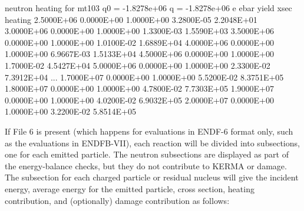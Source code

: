 \small
\begin{ccode}

 neutron heating for mt103   q0 = -1.8278e+06     q = -1.8278e+06
              e          ebar         yield          xsec       heating
     2.5000E+06    0.0000E+00    1.0000E+00    3.2800E-05    2.2048E+01
     3.0000E+06    0.0000E+00    1.0000E+00    1.3300E-03    1.5590E+03
     3.5000E+06    0.0000E+00    1.0000E+00    1.0100E-02    1.6889E+04
     4.0000E+06    0.0000E+00    1.0000E+00    6.9667E-03    1.5133E+04
     4.5000E+06    0.0000E+00    1.0000E+00    1.7000E-02    4.5427E+04
     5.0000E+06    0.0000E+00    1.0000E+00    2.3300E-02    7.3912E+04
        ...
     1.7000E+07    0.0000E+00    1.0000E+00    5.5200E-02    8.3751E+05
     1.8000E+07    0.0000E+00    1.0000E+00    4.7800E-02    7.7303E+05
     1.9000E+07    0.0000E+00    1.0000E+00    4.0200E-02    6.9032E+05
     2.0000E+07    0.0000E+00    1.0000E+00    3.2200E-02    5.8514E+05

\end{ccode}
\normalsize

If File 6 is present (which happens for evaluations in ENDF-6
format only, such as the evaluations in ENDFB-VII), each reaction
will be divided into subsections, one for each emitted particle.
The neutron subsections are displayed as part of the energy-balance
checks, but they do not contribute to KERMA or damage.  The
subsection for each charged particle or residual nucleus will
give the incident energy, average energy for the emitted particle,
cross section, heating contribution, and (optionally) damage
contribution as follows:

